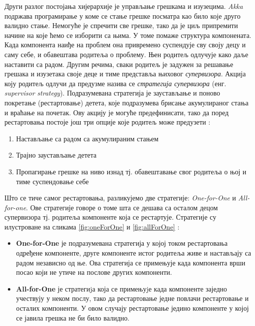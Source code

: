 \documentclass[12pt,oneside]{memoir}
\begin{document}
Други разлог постојања хијерархије је управљање грешкама и изузецима. \textit{Akka} подржава програмирање у коме се стање грешке посматра као било које друго валидно стање. Немогуће је спречити све грешке, тако да је циљ припремити начине на које ћемо се изборити са њима. У томе помаже структура компонената. Када компонента наиђе на проблем она привремено суспендује сву своју децу и саму себе, и обавештава родитеља о проблему. Њен родитељ одлучује како даље наставити са радом. Другим речима, сваки родитељ је задужен за решавање грешака и изузетака своје деце и тиме представља њиховог \textit{супервизора}. Акција коју родитељ одлучи да предузме назива се \textit{стратегија супервизора} (енг. \textit{supervisor strategy}). Подразумевана стратегија је заустављање и поново покретање (рестартовање) детета, које подразумева брисање акумулираног стања и враћање на почетак. Ову акцију је могуће предефинисати, тако да поред рестартовања постоје још три опције које родитељ може предузети \cite{progInScala3, akkaDoc}:
\begin{enumerate}[1)]
\item Настављање са радом са акумулираним стањем
\item Трајно заустављање детета
\item Пропагирање грешке на ниво изнад тј. обавештавање свог родитеља о њој и тиме суспендовање себе
\end{enumerate}

Што се тиче самог рестартовања, разликујемо две стратегије: \textit{One-for-One} и \textit{All-for-one}. Ове стратегије говоре о томе шта се дешава са осталом децом супервизора тј. родитеља компоненте која се рестартује. Стратегије су илустроване на сликама \ref{fig:oneForOne} и \ref{fig:allForOne} \cite{progInScala3, akkaDoc}:
\begin{itemize}
\item \textbf{One-for-One} је подразумевана стратегија у којој током рестартовања одређене компоненте, друге компоненте истог родитеља живе и настављају са радом независно од ње. Ова стратегија се примењује када компонента врши посао који не утиче на послове других компоненти.
\item \textbf{All-for-One} је стратегиjа која се примењуjе када компоненте заједно учествују у неком послу, тако да рестартовање једне повлачи рестартовање и осталих компоненти. У овом случају рестартовање једино компоненте у којој се јавила грешка не би било валидно.
\end{itemize}
\end{document}
